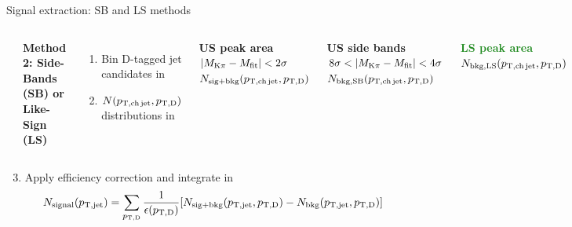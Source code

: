 \documentclass[xcolor={usenames,dvipsnames}]{beamer}
\begin{document}
\begin{frame}{Signal extraction: SB and LS methods}
\begin{columns}

\includegraphics[width=\textwidth]{img/HQ16_Simulation_InvMassSB}

\textbf{\alert{Method 2: Side-Bands (SB) or Like-Sign (LS)}}
\begin{enumerate}
\item Bin D-tagged jet candidates in \ptd
\item $N(p_{\mathrm{T,ch\, jet}}, p_{\mathrm{T,D}})$ distributions in
\end{enumerate}
\medskip

\textcolor{NavyBlue}{\textbf{US peak area} {\footnotesize $|M_{\rm K\pi} - M_{\rm fit}| <2\sigma$}\\ 
{\small $N_{\rm sig+bkg} (p_{\mathrm{T,ch\, jet}}, p_{\mathrm{T,D}})$}}
\medskip

\textcolor{BrickRed}{\textbf{US side bands} {\footnotesize $8\sigma <|M_{\rm K\pi} - M_{\rm fit}| < 4\sigma$}\\ 
{\small $N_{\rm bkg, SB} (p_{\mathrm{T,ch\, jet}}, p_{\mathrm{T,D}})$}}
\medskip

\textcolor{ForestGreen}{\textbf{LS peak area}\\ 
{\small $N_{\rm bkg, LS} (p_{\mathrm{T,ch\, jet}}, p_{\mathrm{T,D}})$}}

\end{columns}
\begin{enumerate}
\setcounter{enumi}{2}
\item Apply efficiency correction and integrate in \ptd
{\small $$N_{\rm signal} (p_{\mathrm{T,jet}})=\sum_{p_{\mathrm{T,D}}} \frac{1}{\epsilon(p_{\mathrm{T,D}})} [N_{\rm sig+bkg}(p_{\mathrm{T,jet}}, p_{\mathrm{T,D}}) - N_{\rm bkg}(p_{\mathrm{T,jet}}, p_{\mathrm{T,D}})]$$}
\end{enumerate}
\end{frame}
\end{document}
